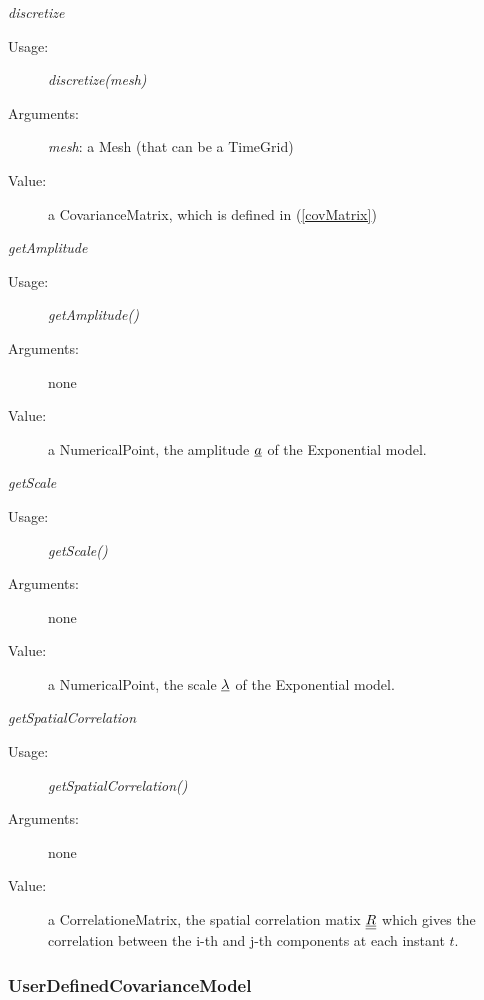 \begin{description}
\begin{description}

\item \textit{discretize}
\begin{description}
\item[Usage:] \textit{discretize(mesh)}
\item[Arguments:] \textit{mesh}: a Mesh (that can be a TimeGrid)
\item[Value:]   a CovarianceMatrix, which is defined in (\ref{covMatrix})
\end{description}
\bigskip

\item \textit{getAmplitude}
\begin{description}
\item[Usage:] \textit{getAmplitude()}
\item[Arguments:] none
\item[Value:]   a NumericalPoint, the amplitude ${\underline{a}}$ of the Exponential model.
\end{description}
\bigskip

\item \textit{getScale}
\begin{description}
\item[Usage:] \textit{getScale()}
\item[Arguments:] none
\item[Value:]   a NumericalPoint, the scale ${\underline{\lambda}}$ of the Exponential model.
\end{description}
\bigskip

\item \textit{getSpatialCorrelation}
\begin{description}
\item[Usage:] \textit{getSpatialCorrelation()}
\item[Arguments:] none
\item[Value:]   a CorrelationeMatrix, the spatial correlation matix ${\underline{\underline{R}}}$ which gives the correlation between the i-th and j-th components at each instant $t$.
\end{description}
\bigskip

\end{description}

\end{description}

\newpage \subsubsection{UserDefinedCovarianceModel}

